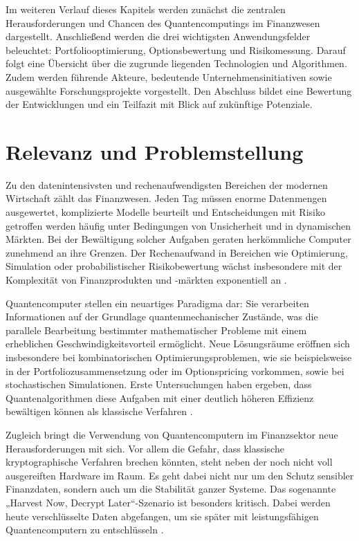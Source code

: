 Im weiteren Verlauf dieses Kapitels werden zunächst die zentralen Herausforderungen und Chancen des Quantencomputings im Finanzwesen dargestellt. Anschließend werden die drei wichtigsten Anwendungsfelder beleuchtet: Portfoliooptimierung, Optionsbewertung und Risikomessung. Darauf folgt eine Übersicht über die zugrunde liegenden Technologien und Algorithmen. Zudem werden führende Akteure, bedeutende Unternehmensinitiativen sowie ausgewählte Forschungsprojekte vorgestellt. Den Abschluss bildet eine Bewertung der Entwicklungen und ein Teilfazit mit Blick auf zukünftige Potenziale.

\section{Relevanz und Problemstellung}
Zu den datenintensivsten und rechenaufwendigsten Bereichen der modernen Wirtschaft zählt das Finanzwesen. Jeden Tag müssen enorme Datenmengen ausgewertet, komplizierte Modelle beurteilt und Entscheidungen mit Risiko getroffen werden   häufig unter Bedingungen von Unsicherheit und in dynamischen Märkten. Bei der Bewältigung solcher Aufgaben geraten herkömmliche Computer zunehmend an ihre Grenzen. Der Rechenaufwand in Bereichen wie Optimierung, Simulation oder probabilistischer Risikobewertung wächst insbesondere mit der Komplexität von Finanzprodukten und -märkten exponentiell an \cite{springer2025,plos2024}.

Quantencomputer stellen ein neuartiges Paradigma dar: Sie verarbeiten Informationen auf der Grundlage quantenmechanischer Zustände, was die parallele Bearbeitung bestimmter mathematischer Probleme mit einem erheblichen Geschwindigkeitsvorteil ermöglicht. Neue Lösungsräume eröffnen sich insbesondere bei kombinatorischen Optimierungsproblemen, wie sie beispielsweise in der Portfoliozusammensetzung oder im Optionspricing vorkommen, sowie bei stochastischen Simulationen. Erste Untersuchungen haben ergeben, dass Quantenalgorithmen diese Aufgaben mit einer deutlich höheren Effizienz bewältigen können als klassische Verfahren \cite{quantumjournal2020,orus2019}.

Zugleich bringt die Verwendung von Quantencomputern im Finanzsektor neue Herausforderungen mit sich. Vor allem die Gefahr, dass klassische kryptographische Verfahren brechen könnten, steht neben der noch nicht voll ausgereiften Hardware im Raum. Es geht dabei nicht nur um den Schutz sensibler Finanzdaten, sondern auch um die Stabilität ganzer Systeme. Das sogenannte „Harvest Now, Decrypt Later“-Szenario ist besonders kritisch. Dabei werden heute verschlüsselte Daten abgefangen, um sie später mit leistungsfähigen Quantencomputern zu entschlüsseln \cite{finance21net}.

